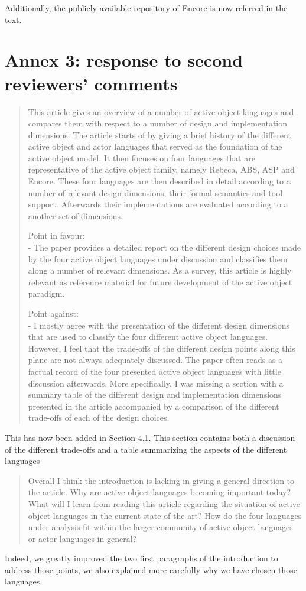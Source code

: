 \documentclass{article}
\begin{document}
Additionally,  the publicly available repository of Encore is now referred in the 
text.

\section*{Annex 3: response to second reviewers' comments}


\begin{quote}
	This article gives an overview of a number of active object languages and compares 
	them 
with respect to a number of design and implementation dimensions. The article starts of 
by giving a brief history of the different active object and actor languages that served 
as the foundation of the active object model. It then focuses on four languages that are 
representative of the active object family, namely Rebeca, ABS, ASP and Encore. These 
four languages are then described in detail according to a number of relevant design 
dimensions, their formal semantics and tool support. Afterwards their implementations are 
evaluated according to a another set of dimensions. 


Point in favour:\\
- The paper provides a detailed report on the different design choices made by the four 
active object languages under discussion and classifies them along a number of relevant 
dimensions. As a survey, this article is highly relevant as reference material for future 
development of the active object paradigm.

Point against:\\
- I mostly agree with the presentation of the different design dimensions that are used 
to classify the four different active object languages. However, I feel that the 
trade-offs of the different design points along this plane are not always adequately 
discussed. The paper often reads as a factual record of the four presented active object 
languages with little discussion afterwards. More specifically, I was missing a section 
with a summary table of the different design and implementation dimensions presented in 
the article accompanied by a comparison of the different trade-offs of each of the design 
choices.
\end{quote}
This has now been added in Section 4.1. This section contains both a discussion of the 
different trade-offs and a table summarizing the aspects of the different languages

\begin{quote}
	Overall I think the introduction is lacking in giving a general direction to the 
article. Why are active object languages becoming important today? What will I learn from 
reading this article regarding the situation of active object languages in the current 
state of the art? How do the four languages under analysis fit within the larger 
community of active object languages or actor languages in general?
\end{quote}
Indeed, we greatly improved the two first paragraphs of the introduction to address those 
points, we also explained more carefully why we have chosen those languages.
\end{document}
